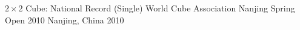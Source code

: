 


\begin{cvhonors}

  \cvhonor
    {$2 \times 2$ Cube: National Record (Single)} %
    {World Cube Association Nanjing Spring Open 2010} %
    {Nanjing, China} %
    {2010} %

\end{cvhonors}

